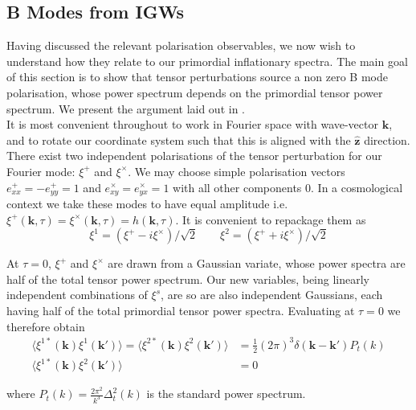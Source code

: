 \documentclass[a4paper,10pt]{article}
\renewcommand{\v}[1]{\mathbf{#1}}
\newcommand{\half}{\frac{1}{2}}
\newcommand{\unit}[1]{\hat{\v{#1}}}
\begin{document}
\subsection{B Modes from IGWs}

Having discussed the relevant polarisation observables, we now wish to understand how they relate to our primordial inflationary spectra. The main goal of this section is to show that tensor perturbations source a non zero B mode polarisation, whose power spectrum depends on the primordial tensor power spectrum. We present the argument laid out in \cite{all-sky}.\\

It is most convenient throughout to work in Fourier space with wave-vector $\v{k}$, and to rotate our coordinate system such that this is aligned with the $\unit{z}$ direction. There exist two independent polarisations of the tensor perturbation for our Fourier mode: $\xi^+$ and $\xi^\times$. We may choose simple polarisation vectors $e^+_{xx}=-e^+_{yy}=1$ and $e^\times_{xy}=e^\times_{yx}=1$ with all other components 0. In a cosmological context we take these modes to have equal amplitude i.e. $\xi^+(\v{k},\tau)=\xi^\times(\v{k},\tau)=h(\v{k},\tau)$. It is convenient to repackage them as
\begin{equation}
\xi^1 = (\xi^+ - i\xi^\times)/\sqrt{2} \qquad \xi^2 = (\xi^+ + i\xi^\times)/\sqrt{2}
\end{equation}

At $\tau=0$, $\xi^+$ and $\xi^\times$ are drawn from a Gaussian variate, whose power spectra are half of the total tensor power spectrum. Our new variables, being linearly independent combinations of $\xi^s$, are so are also independent Gaussians, each having half of the total primordial tensor power spectra. Evaluating at $\tau=0$ we therefore obtain
\begin{equation}
\begin{split}
\langle \xi^{1*}(\v{k})\xi^{1}(\v{k'})\rangle=\langle \xi^{2*}(\v{k})\xi^{2}(\v{k'})\rangle &=\half (2\pi)^3\delta(\v{k}-\v{k'})P_t(k)\\
\langle \xi^{1*}(\v{k})\xi^{2}(\v{k'})\rangle &=0
\end{split}
\label{statprops}
\end{equation}

where $P_t(k) = \frac{2\pi^2}{k^3}\Delta_t^2(k)$ is the standard power spectrum.\\
\end{document}
